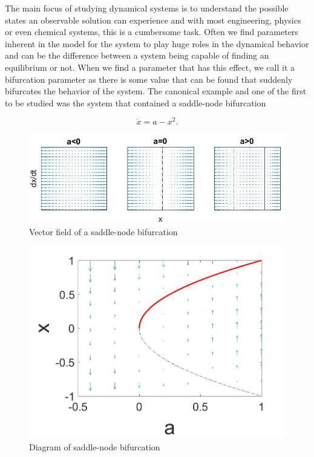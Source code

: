 The main focus of studying dynamical systems is to understand the possible states an observable solution can experience and with most engineering, physics or even chemical systems, this is a cumbersome task. Often we find parameters inherent in the model for the system to play huge roles in the dynamical behavior and can be the difference between a system being capable of finding an equilibrium or not. When we find a parameter that has this effect, we call it a bifurcation parameter as there is some value that can be found that suddenly bifurcates the behavior of the system. The canonical example and one of the first to be studied was the system that contained a saddle-node bifurcation

\begin{equation}\label{eq:intro_saddlenode}
\dot{x}=a-x^2.
\end{equation}

\begin{figure}[H]
\centering
\includegraphics[width=\linewidth]{intro/saddlenode.jpg}
\caption{Vector field of a saddle-node bifurcation}
\label{fig:intro_saddlenode}
\end{figure}


\begin{figure}[H]
\centering
\includegraphics[width=.7\linewidth]{intro/saddlenode_bif_diagram.jpg}
\caption{Diagram of saddle-node bifurcation}
\label{fig:intro_saddlenode_bif_diagram}
\end{figure}



